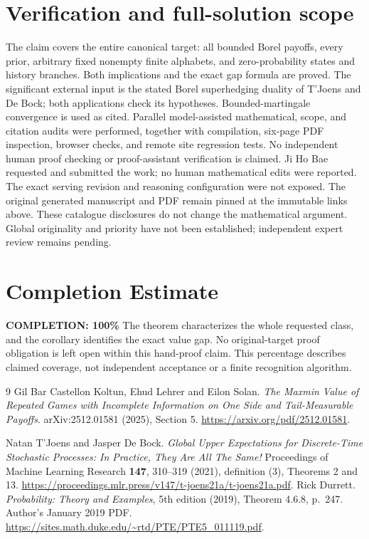 \documentclass[11pt,a4paper]{article}
\theoremstyle{definition}
\begin{document}
\section{Verification and full-solution scope}
The claim covers the entire canonical target: all bounded Borel payoffs,
every prior, arbitrary fixed nonempty finite alphabets, and zero-probability
states and history branches. Both implications and the exact gap formula
are proved. The significant external input is the stated Borel
superhedging duality of T'Joens and De Bock; both applications check its
hypotheses. Bounded-martingale convergence is used as cited.
Parallel model-assisted mathematical, scope, and citation audits were
performed, together with compilation, six-page PDF inspection, browser
checks, and remote site regression tests. No independent human proof
checking or proof-assistant verification is claimed. Ji Ho Bae requested
and submitted the work; no human mathematical edits were reported.
The exact serving revision and reasoning configuration were not exposed.
The original generated manuscript and PDF remain pinned at the immutable
links above. These catalogue disclosures do not change the mathematical
argument. Global originality and priority have not been established;
independent expert review remains pending.

\section{Completion Estimate}
\noindent\textbf{COMPLETION: 100\%}
The theorem characterizes the whole requested class, and the corollary
identifies the exact value gap. No original-target proof obligation is
left open within this hand-proof claim. This percentage describes claimed
coverage, not independent acceptance or a finite recognition algorithm.

\begin{thebibliography}{9}
Gil Bar Castellon Koltun, Ehud Lehrer and Eilon Solan.
\emph{The Maxmin Value of Repeated Games with Incomplete Information on
One Side and Tail-Measurable Payoffs}.
arXiv:2512.01581 (2025), Section 5.
\url{https://arxiv.org/pdf/2512.01581}.

Natan T'Joens and Jasper De Bock.
\emph{Global Upper Expectations for Discrete-Time Stochastic Processes:
In Practice, They Are All The Same!}
Proceedings of Machine Learning Research \textbf{147}, 310--319 (2021),
definition (3), Theorems 2 and 13.
\url{https://proceedings.mlr.press/v147/t-joens21a/t-joens21a.pdf}.
Rick Durrett. \emph{Probability: Theory and Examples}, 5th edition
(2019), Theorem 4.6.8, p.~247. Author's January 2019 PDF.
\url{https://sites.math.duke.edu/~rtd/PTE/PTE5_011119.pdf}.
\end{thebibliography}
\end{document}
